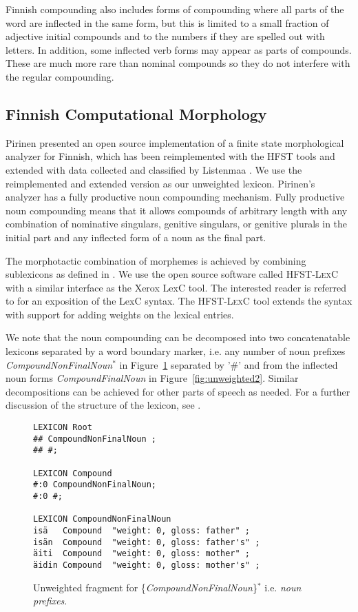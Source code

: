 \documentclass[a4paper]{article}
\begin{document}
Finnish compounding also includes forms of compounding where all parts
of the word are inflected in the same form, but this is limited to a
small fraction of adjective initial compounds and to the numbers if
they are spelled out with letters. In addition, some inflected verb
forms may appear as parts of compounds. These are much more rare than
nominal compounds \cite{iskwww} so they do not interfere with the
regular compounding.

\subsection{Finnish Computational Morphology}
\label{Sect13}

Pirinen \cite{pirinen2008} presented an open source implementation of
a finite state morphological analyzer for Finnish, which has been
reimplemented with the \textsc{HFST} tools and extended with data
collected and classified by Listenmaa \cite{listenmaa2009}. We use the
reimplemented and extended version as our unweighted lexicon.
Pirinen's analyzer has a fully productive noun compounding
mechanism. Fully productive noun compounding means that it allows
compounds of arbitrary length with any combination of nominative
singulars, genitive singulars, or genitive plurals in the initial part
and any inflected form of a noun as the final part. 

The morphotactic combination of morphemes is achieved by combining
sublexicons as defined in \cite{beesley2004}. We use the open source
software called \textsc{HFST-LexC} with a similar interface as the
Xerox LexC tool. The interested reader is referred to
\cite{beesley2004} for an exposition of the LexC syntax. The
\textsc{HFST-LexC} tool extends the syntax with support for adding
weights on the lexical entries. 

We note that the noun compounding can be decomposed into two
concatenatable lexicons separated by a word boundary marker, i.e. any
number of noun prefixes \emph{CompoundNonFinalNoun}$^*$ in
Figure~\ref{fig:unweighted1} separated by '\#' and from the inflected
noun forms \emph{CompoundFinalNoun} in
Figure~\ref{fig:unweighted2}. Similar decompositions can be achieved
for other parts of speech as needed. For a further discussion of the
structure of the lexicon, see \cite{linden09nodalida}.

\begin{figure}[h!]
  \centering
  \begin{scriptsize}
\begin{verbatim}
LEXICON Root
## CompoundNonFinalNoun ;
## #;

LEXICON Compound
#:0 CompoundNonFinalNoun;
#:0 #;

LEXICON CompoundNonFinalNoun
isä   Compound  "weight: 0, gloss: father" ;
isän  Compound  "weight: 0, gloss: father's" ;
äiti  Compound  "weight: 0, gloss: mother" ;
äidin Compound  "weight: 0, gloss: mother's" ;
\end{verbatim}
  \end{scriptsize}
  \caption{Unweighted fragment for
    \{\emph{CompoundNonFinalNoun}\}$^*$ i.e. \emph{noun
      prefixes}.}\label{fig:unweighted1}
\end{figure}
\end{document}
